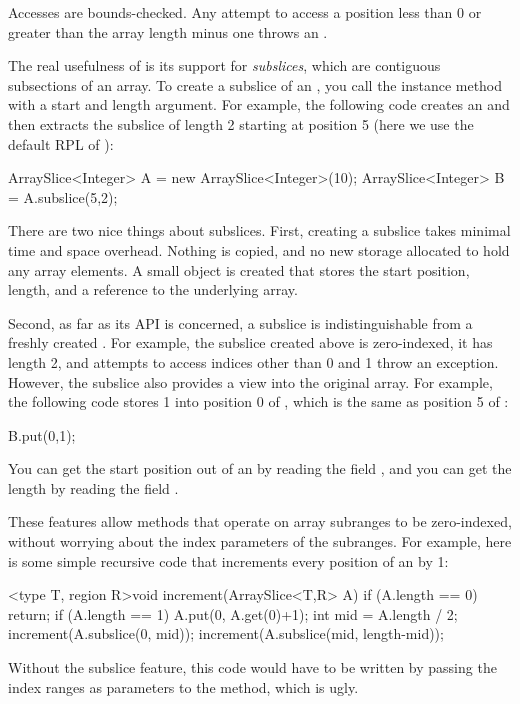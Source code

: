 Accesses are bounds-checked.  Any attempt to access a position less
than 0 or greater than the array length minus one throws an
.

 The real usefulness of  is its
support for \emph{subslices}, which are contiguous subsections of an
array.  To create a subslice of an , you call the
 instance method with a start and length argument.  For
example, the following code creates an  and then extracts
the subslice of length 2 starting at position 5 (here we use the
default RPL of ):
%
\begin{dpjlisting}
ArraySlice<Integer> A = new ArraySlice<Integer>(10);
ArraySlice<Integer> B = A.subslice(5,2);
\end{dpjlisting}

There are two nice things about subslices.  First, creating a subslice
takes minimal time and space overhead.  Nothing is copied, and no new
storage allocated to hold any array elements.  A small object is
created that stores the start position, length, and a reference to the
underlying array.

Second, as far as its API is concerned, a subslice is
indistinguishable from a freshly created .  For example,
the subslice created above is zero-indexed, it has length 2, and
attempts to access indices other than 0 and 1 throw an exception.
However, the subslice also provides a view into the original array.
For example, the following code stores 1 into position 0 of ,
which is the same as position 5 of :
%
\begin{dpjlisting}
B.put(0,1);
\end{dpjlisting}
%
You can get the start position out of an  by reading the
field , and you can get the length by reading the field
.

These features allow methods that operate on array subranges to be
zero-indexed, without worrying about the index parameters of the
subranges.  For example, here is some simple recursive code that
increments every position of an  by 1:
%
\begin{dpjlisting}
<type T, region R>void increment(ArraySlice<T,R> A) {
    if (A.length == 0) return;
    if (A.length == 1) {
        A.put(0, A.get(0)+1);
    }
    int mid = A.length / 2;
    increment(A.subslice(0, mid));
    increment(A.subslice(mid, length-mid));
}
\end{dpjlisting}
%
Without the subslice feature, this code would have to be written by
passing the index ranges as parameters to the  method,
which is ugly.

